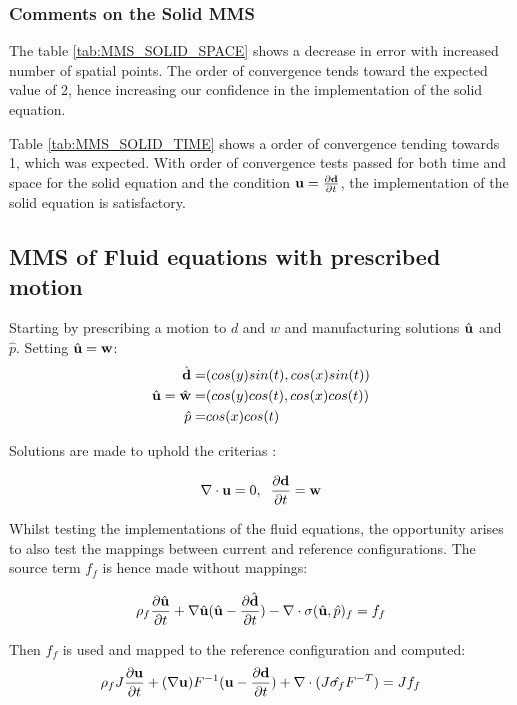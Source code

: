 \subsubsection*{Comments on the Solid MMS}
The table \ref{tab:MMS_SOLID_SPACE} shows a decrease in error with increased number of spatial points. The order of convergence tends toward the expected value of 2, hence increasing our confidence in the implementation of the solid equation.\newline

Table \ref{tab:MMS_SOLID_TIME} shows a order of convergence tending towards 1, which was expected. With order of convergence tests passed for both time and space for the solid equation and the condition $\bold{u} = \frac{\partial \bold{d}}{\partial t}$, the implementation of the solid equation is satisfactory. 


\subsection{MMS of Fluid equations with prescribed motion}
Starting by prescribing a motion to $ d$ and $w$ and manufacturing solutions $\hat{\bold{u}}$ and $\hat{p}$. Setting $\hat{\bold{u}} = \bold{w}$:
\begin{align*}
\hat{\bold{d}} =& ( cos(y)sin(t) , cos(x)sin(t) )\\
\hat{\bold{u}} = \hat{\bold{w}}=& ( cos(y)cos(t), cos(x)cos(t) ) \\
\hat{p} =& cos(x)cos(t)
\end{align*}

Solutions are made to uphold the criterias : 

$$ \nabla \cdot \bold{u} =0  ,\hspace{2mm} \frac{\partial \bold{d}}{\partial t} = \bold{w}  $$

Whilst testing the implementations of the fluid equations, the opportunity arises to also test the mappings between current and reference configurations.
The source term $f_f$ is hence made without mappings:

$$ \rho_f \frac{\partial \hat{\bold{u}}}{\partial t}  +  \nabla \hat{\bold{u}} (\hat{\bold{u}} - \frac{\partial \hat{\bold{d}}}{\partial t})  -  \nabla \cdot \sigma(\hat{\bold{u}}, \hat{p})_f  = f_f $$

Then $f_f$ is used and mapped to the reference configuration and computed:
$$ \rho_f J \frac{\partial \bold{u}}{\partial t} + (\nabla \bold{u})F^{-1}(\bold{u}-\frac{\partial \bold{d}}{\partial t})  + \nabla \cdot( J \hat{\sigma_f} F^{-T}) = J f_f$$

